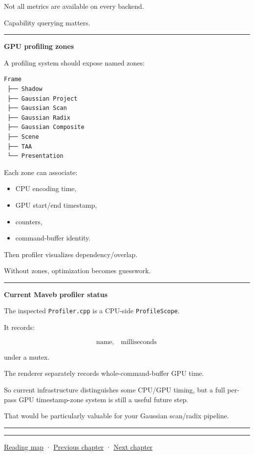Not all metrics are available on every backend.

Capability querying matters.

\begin{center}\rule{0.5\linewidth}{0.5pt}\end{center}

\textbf{GPU profiling zones}

A profiling system should expose named zones:

\protect{}\label{p10-zones}%
\begin{verbatim}
Frame
 ├── Shadow
 ├── Gaussian Project
 ├── Gaussian Scan
 ├── Gaussian Radix
 ├── Gaussian Composite
 ├── Scene
 ├── TAA
 └── Presentation
\end{verbatim}

Each zone can associate:

\begin{itemize}
\tightlist
\item
  CPU encoding time,
\item
  GPU start/end timestamp,
\item
  counters,
\item
  command-buffer identity.
\end{itemize}

Then profiler visualizes dependency/overlap.

Without zones, optimization becomes guesswork.

\begin{center}\rule{0.5\linewidth}{0.5pt}\end{center}

\textbf{Current Maveb profiler status}

The inspected \texttt{Profiler.cpp} is a CPU-side \texttt{ProfileScope}.

It records:

\[
\text{name},
\quad
\text{milliseconds}
\]

under a mutex.

The renderer separately records whole-command-buffer GPU time.

So current infrastructure distinguishes some CPU/GPU timing, but a full per-pass GPU timestamp-zone system is still a useful future step.

That would be particularly valuable for your Gaussian scan/radix pipeline.

\begin{center}\rule{0.5\linewidth}{0.5pt}\end{center}

\begin{center}\rule{0.5\linewidth}{0.5pt}\end{center}

\hyperref[volume-reading-map]{Reading map} · \hyperref[05-engine-i-ch018]{Previous chapter} · \hyperref[05-engine-i-ch020]{Next chapter}

